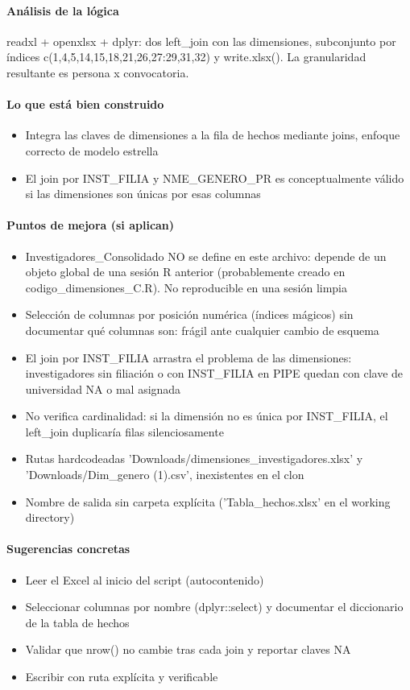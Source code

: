 \paragraph{Análisis de la lógica}
readxl + openxlsx + dplyr: dos left\_join con las dimensiones, subconjunto por índices c(1,4,5,14,15,18,21,26,27:29,31,32) y write.xlsx(). La granularidad resultante es persona x convocatoria.

\paragraph{Lo que está bien construido}
\begin{itemize}
  \item Integra las claves de dimensiones a la fila de hechos mediante joins, enfoque correcto de modelo estrella
  \item El join por INST\_FILIA y NME\_GENERO\_PR es conceptualmente válido si las dimensiones son únicas por esas columnas
\end{itemize}

\paragraph{Puntos de mejora (si aplican)}
\begin{itemize}
  \item Investigadores\_Consolidado NO se define en este archivo: depende de un objeto global de una sesión R anterior (probablemente creado en codigo\_dimensiones\_C.R). No reproducible en una sesión limpia
  \item Selección de columnas por posición numérica (índices mágicos) sin documentar qué columnas son: frágil ante cualquier cambio de esquema
  \item El join por INST\_FILIA arrastra el problema de las dimensiones: investigadores sin filiación o con INST\_FILIA en PIPE quedan con clave de universidad NA o mal asignada
  \item No verifica cardinalidad: si la dimensión no es única por INST\_FILIA, el left\_join duplicaría filas silenciosamente
  \item Rutas hardcodeadas 'Downloads/dimensiones\_investigadores.xlsx' y 'Downloads/Dim\_genero (1).csv', inexistentes en el clon
  \item Nombre de salida sin carpeta explícita ('Tabla\_hechos.xlsx' en el working directory)
\end{itemize}

\paragraph{Sugerencias concretas}
\begin{itemize}
  \item Leer el Excel al inicio del script (autocontenido)
  \item Seleccionar columnas por nombre (dplyr::select) y documentar el diccionario de la tabla de hechos
  \item Validar que nrow() no cambie tras cada join y reportar claves NA
  \item Escribir con ruta explícita y verificable
\end{itemize}

